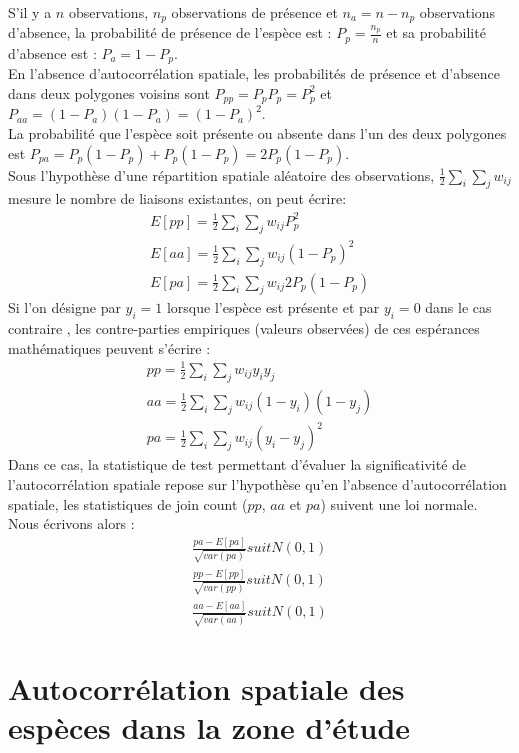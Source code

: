 \documentclass[a4paper, oneside, 12pt]{book}
\begin{document}
S’il y a $n$ observations, $n_p$ observations de présence et $n_a = n-n_p$ observations d'absence, la probabilité de présence de l'espèce est : $P_p = \frac{n_p}{n}$
et sa probabilité d’absence
est : $P_a = 1-P_p$.\\
En l’absence d’autocorrélation spatiale, les probabilités de présence et d'absence dans deux polygones voisins sont $P_{pp}=P_pP_p=P_p^2$ et $P_{aa}=(1-P_a)(1-P_a)=(1-P_a)^2$.\\
La probabilité que l'espèce soit présente ou absente dans l'un des deux polygones est $P_{pa}=P_p(1-P_p)+P_p(1-P_p)=2P_p(1-P_p)$.\\
Sous l’hypothèse d’une répartition spatiale aléatoire des observations, $\frac{1}{2}\sum_i\sum_jw_{ij}$  mesure le nombre de liaisons existantes, on peut écrire:
\begin{eqnarray}
E[pp] = \frac{1}{2} \sum_i\sum_jw_{ij}P_p^2\\
E[aa] = \frac{1}{2} \sum_i\sum_jw_{ij}(1-P_p)^2 \\
E[pa] = \frac{1}{2} \sum_i\sum_jw_{ij}2P_p(1-P_p)
\end{eqnarray}
Si l’on désigne par $y_i = 1$ lorsque l’espèce est présente et par $y_i = 0$ dans le cas
contraire , les contre-parties empiriques (valeurs observées) de ces espérances
mathématiques peuvent s’écrire :
\begin{eqnarray}
pp = \frac{1}{2} \sum_i\sum_jw_{ij}y_iy_j\\
aa = \frac{1}{2} \sum_i\sum_jw_{ij}(1-y_i)(1-y_j) \\
pa = \frac{1}{2} \sum_i\sum_jw_{ij}(y_i-y_j)^2
\end{eqnarray}
Dans ce cas, la statistique de test permettant d’évaluer la significativité de l’autocorrélation
spatiale repose sur l’hypothèse qu’en l’absence d’autocorrélation spatiale, les statistiques de join
count ($pp$, $aa$ et $pa$) suivent une loi normale. Nous écrivons alors :
\begin{eqnarray}
\frac{pa-E[pa]}{\sqrt{var(pa)}} suit \mathit{N}(0,1)\\
\frac{pp-E[pp]}{\sqrt{var(pp)}} suit \mathit{N}(0,1)\\
\frac{aa-E[aa]}{\sqrt{var(aa)}} suit \mathit{N}(0,1)
\end{eqnarray}
\section{Autocorrélation spatiale des espèces dans la zone d'étude}
\end{document}
